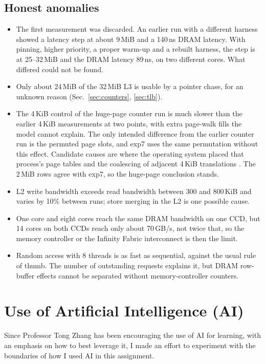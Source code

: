 \documentclass{article}
\begin{document}
\subsection{Honest anomalies}\label{sec:anomalies}
\begin{itemize}
  \item The first measurement was discarded. An earlier run with a different harness showed a latency step at about 9\,MiB and a 140\,ns DRAM latency. With pinning, higher priority, a proper warm-up and a rebuilt harness, the step is at 25--32\,MiB and the DRAM latency 89\,ns, on two different cores. What differed could not be found.
  \item Only about 24\,MiB of the 32\,MiB L3 is usable by a pointer chase, for an unknown reason (Sec.~\ref{sec:counters}, \ref{sec:tlb}).
  \item The 4\,KiB control of the huge-page counter run is much slower than the earlier 4\,KiB measurements at two points, with extra page-walk fills the model cannot explain. The only intended difference from the earlier counter run is the permuted page slots, and exp7 uses the same permutation without this effect. Candidate causes are where the operating system placed that process's page tables and the coalescing of adjacent 4\,KiB translations \cite{perfzen5}. The 2\,MiB rows agree with exp7, so the huge-page conclusion stands.
  \item L2 write bandwidth exceeds read bandwidth between 300 and 800\,KiB and varies by 10\% between runs; store merging in the L2 is one possible cause.
  \item One core and eight cores reach the same DRAM bandwidth on one CCD, but 14 cores on both CCDs reach only about 70\,GB/s, not twice that, so the memory controller or the Infinity Fabric interconnect is then the limit.
  \item Random access with 8 threads is as fast as sequential, against the usual rule of thumb. The number of outstanding requests explains it, but DRAM row-buffer effects cannot be separated without memory-controller counters.
\end{itemize}

\section{Use of Artificial Intelligence (AI)}\label{sec:aiuse}
Since Professor Tong Zhang has been encouraging the use of AI for learning, with an emphasis on how to best leverage it, I made an effort to experiment with the boundaries of how I used AI in this assignment.
\end{document}
